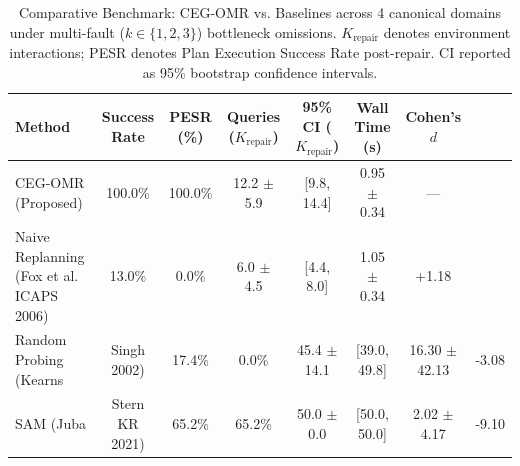 \begin{table}[t]
\centering
\caption{Comparative Benchmark: CEG-OMR vs. Baselines across 4 canonical domains under multi-fault ($k \in \{1, 2, 3\}$) bottleneck omissions. $K_{\text{repair}}$ denotes environment interactions; PESR denotes Plan Execution Success Rate post-repair. CI reported as 95\% bootstrap confidence intervals.}
\label{tab:main_results}
\small
\begin{tabular}{lcccccc}
\toprule
\textbf{Method} & \textbf{Success Rate} & \textbf{PESR (\%)} & \textbf{Queries ($K_{\text{repair}}$)} & \textbf{95\% CI ($K_{\text{repair}}$)} & \textbf{Wall Time (s)} & \textbf{Cohen's $d$} \\
\midrule
CEG-OMR (Proposed) & 100.0\% & 100.0\% & 12.2 $\pm$ 5.9 & [9.8, 14.4] & 0.95 $\pm$ 0.34 & --- \\
Naive Replanning (Fox et al. ICAPS 2006) & 13.0\% & 0.0\% & 6.0 $\pm$ 4.5 & [4.4, 8.0] & 1.05 $\pm$ 0.34 & +1.18 \\
Random Probing (Kearns & Singh 2002) & 17.4\% & 0.0\% & 45.4 $\pm$ 14.1 & [39.0, 49.8] & 16.30 $\pm$ 42.13 & -3.08 \\
SAM (Juba & Stern KR 2021) & 65.2\% & 65.2\% & 50.0 $\pm$ 0.0 & [50.0, 50.0] & 2.02 $\pm$ 4.17 & -9.10 \\
\bottomrule
\end{tabular}
\end{table}
